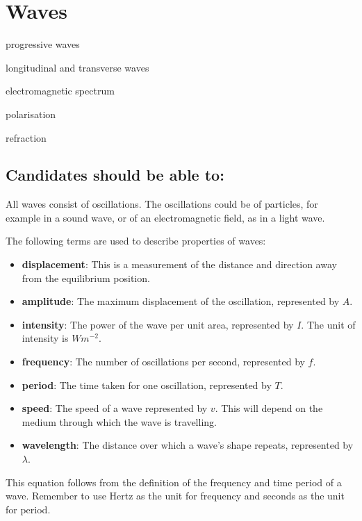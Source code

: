 \documentclass[revision-guide.tex]{subfiles}
\begin{document}
\chapter{Waves}
\begin{content}
\item progressive waves
\item longitudinal and transverse waves
\item electromagnetic spectrum
\item polarisation
\item refraction
\end{content}

\section*{Candidates should be able to:}

All waves consist of oscillations. The oscillations could be of particles, for example in a sound wave, or of an electromagnetic field, as in a light wave.

The following terms are used to describe properties of waves:
\begin{itemize}
\item \textbf{displacement}: This is a measurement of the distance and direction away from the equilibrium position.
\item \textbf{amplitude}: The maximum displacement of the oscillation, represented by $A$.
\item \textbf{intensity}: The power of the wave per unit area, represented by $I$. The unit of intensity is $Wm^{-2}$.
\item \textbf{frequency}: The number of oscillations per second, represented by $f$.
\item \textbf{period}: The time taken for one oscillation, represented by $T$.
\item \textbf{speed}: The speed of a wave represented by $v$. This will depend on the medium through which the wave is travelling.
\item \textbf{wavelength}: The distance over which a wave's shape repeats, represented by $\lambda$.

\end{itemize}


This equation follows from the definition of the frequency and time period of a wave. Remember to use Hertz as the unit for frequency and seconds as the unit for period.
\end{document}
